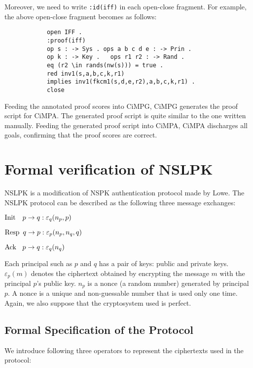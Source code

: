 \documentclass[10pt, conference, compsocconf]{IEEEtran}
\begin{document}
	Moreover, we need to write \verb!:id(iff)! in each open-close
	fragment. For example, the above open-close fragment becomes as follows:
	
	\begin{small}
		\begin{verbatim}
			open IFF .
			:proof(iff)
			op s : -> Sys . ops a b c d e : -> Prin .
			op k : -> Key .   ops r1 r2 : -> Rand .
			eq (r2 \in rands(nw(s))) = true .
			red inv1(s,a,b,c,k,r1) 
			implies inv1(fkcm1(s,d,e,r2),a,b,c,k,r1) .
			close
		\end{verbatim}
	\end{small}
	
	Feeding the annotated proof scores into CiMPG, CiMPG generates the
	proof script for CiMPA. The generated proof script is quite similar to
	the one written manually. Feeding the generated proof script into
	CiMPA, CiMPA discharges all goals, confirming that the proof scores
	are correct. 
	
	
	\section{Formal verification of NSLPK}
	\label{sect_nslpk}
	NSLPK \cite{nslpk95} is a modification of NSPK authentication protocol \cite{nspk78} made by Lowe. 
	The NSLPK protocol can be described as the following three message exchanges:
	
	${\rm Init} \ \ \ p \rightarrow q : \varepsilon_q(n_p, p)$
	
	${\rm Resp} \ \, q \rightarrow p : \varepsilon_p(n_p, n_q,q)$
	
	${\rm Ack} \ \ \: p \rightarrow q : \varepsilon_q(n_q)$
	
	\noindent
	Each principal such as $p$ and $q$ has a pair of keys: public and private keys. $\varepsilon_p(m)$ denotes the ciphertext obtained by encrypting the message $m$ with the principal $p$'s public key. $n_p$ is a nonce (a random number) generated by principal $p$. 
	A nonce is a unique and non-guessable number that is used only one time.
	Again, we also suppose that the cryptosystem used is perfect.
	
	\subsection{Formal Specification of the Protocol}
	We introduce following three operators to represent the ciphertexts used in the protocol:
	
\end{document}
